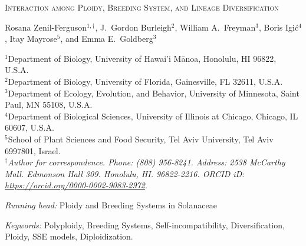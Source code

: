 \documentclass[11pt]{article}
\begin{document}


%
\begin{center}
    \textsc{Interaction among Ploidy, Breeding System, and Lineage Diversification}

\vfill

\noindent 
Rosana Zenil-Ferguson$^{1,\dagger}$,
%
J.~Gordon Burleigh$^{2}$,
%
William A.~Freyman$^{3}$,
%
Boris Igi\'c$^{4}$,
%
Itay Mayrose$^{5}$,
%
and Emma E.~Goldberg$^{3}$
%
\end{center}
%
\noindent$^{1}$Department of Biology, University of Hawai'i M\={a}noa, Honolulu, HI 96822, U.S.A.\\
%
\noindent$^{2}$Department of Biology, University of Florida, Gainesville, FL 32611, U.S.A.\\
%
\noindent$^{3}$Department of Ecology, Evolution, and Behavior, University of Minnesota, Saint Paul, MN 55108, U.S.A.\\
%
\noindent$^{4}$Department of Biological Sciences, University of Illinois at Chicago, Chicago, IL 60607, U.S.A. \\
%
\noindent$^{5}$School of Plant Sciences and Food Security, Tel Aviv University, Tel Aviv 6997801, Israel.\\
%
\noindent$^\dagger$\textit{Author for correspondence. Phone: (808) 956-8241. Address: 2538 McCarthy Mall. Edmonson Hall 309. Honolulu, HI. 96822-2216. ORCID iD: \url{https://orcid.org/0000-0002-9083-2972}}.\\

\vfill

\noindent\textit{Running head:} 
Ploidy and Breeding Systems in Solanaceae

\noindent \textit{Keywords:} 
Polyploidy,
Breeding Systems,
Self-incompatibility,
Diversification, 
Ploidy,
SSE models,
Diploidization.

\vfill

\linenumbers


\clearpage


\end{document}
